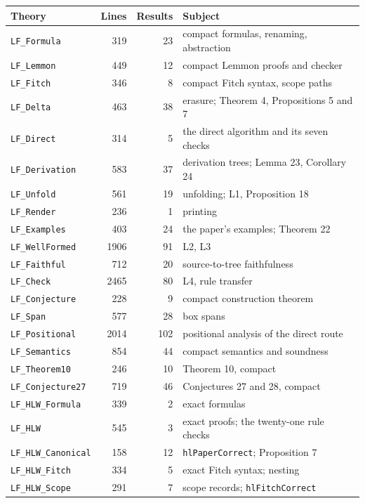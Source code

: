 \documentclass[11pt]{article}
\theoremstyle{plain}
\newcommand{\ubrk}{\_\discretionary{}{}{}}
\newcommand{\isa}[1]{\textup{\texttt{\small #1}}}
\newcommand{\thy}[1]{\textup{\texttt{\small #1}}}
\begin{document}
\begin{longtable}{@{}lrr l@{}}
\toprule
Theory & Lines & Results & Subject \\
\midrule
\endhead
\thy{LF\ubrk{}Formula} & 319 & 23 & compact formulas, renaming, abstraction \\
\thy{LF\ubrk{}Lemmon} & 449 & 12 & compact Lemmon proofs and checker \\
\thy{LF\ubrk{}Fitch} & 346 & 8 & compact Fitch syntax, scope paths \\
\thy{LF\ubrk{}Delta} & 463 & 38 & erasure; Theorem 4, Propositions 5 and 7 \\
\thy{LF\ubrk{}Direct} & 314 & 5 & the direct algorithm and its seven checks \\
\thy{LF\ubrk{}Derivation} & 583 & 37 & derivation trees; Lemma 23, Corollary 24 \\
\thy{LF\ubrk{}Unfold} & 561 & 19 & unfolding; L1, Proposition 18 \\
\thy{LF\ubrk{}Render} & 236 & 1 & printing \\
\thy{LF\ubrk{}Examples} & 403 & 24 & the paper's examples; Theorem 22 \\
\thy{LF\ubrk{}WellFormed} & 1906 & 91 & L2, L3 \\
\thy{LF\ubrk{}Faithful} & 712 & 20 & source-to-tree faithfulness \\
\thy{LF\ubrk{}Check} & 2465 & 80 & L4, rule transfer \\
\thy{LF\ubrk{}Conjecture} & 228 & 9 & compact construction theorem \\
\thy{LF\ubrk{}Span} & 577 & 28 & box spans \\
\thy{LF\ubrk{}Positional} & 2014 & 102 & positional analysis of the direct route \\
\thy{LF\ubrk{}Semantics} & 854 & 44 & compact semantics and soundness \\
\thy{LF\ubrk{}Theorem10} & 246 & 10 & Theorem 10, compact \\
\thy{LF\ubrk{}Conjecture27} & 719 & 46 & Conjectures 27 and 28, compact \\
\midrule
\thy{LF\ubrk{}HLW\ubrk{}Formula} & 339 & 2 & exact formulas \\
\thy{LF\ubrk{}HLW} & 545 & 3 & exact proofs; the twenty-one rule checks \\
\thy{LF\ubrk{}HLW\ubrk{}Canonical} & 158 & 12 & \isa{hlPaperCorrect}; Proposition 7 \\
\thy{LF\ubrk{}HLW\ubrk{}Fitch} & 334 & 5 & exact Fitch syntax; nesting \\
\thy{LF\ubrk{}HLW\ubrk{}Scope} & 291 & 7 & scope records; \isa{hlFitchCorrect} \\

\end{longtable}
\end{document}
